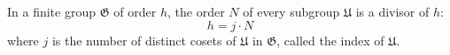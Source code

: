 In a finite group $\mathfrak{G}$ of order $h$, the order $N$ of every subgroup $\mathfrak{U}$ is a divisor of $h$:
$$h = j \cdot N$$
where $j$ is the number of distinct cosets of $\mathfrak{U}$ in $\mathfrak{G}$, called the index of $\mathfrak{U}$.
